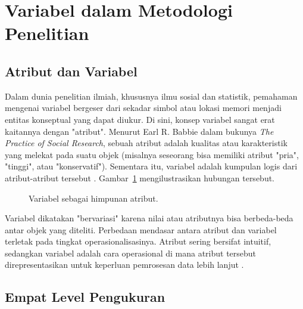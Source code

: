 \documentclass[11pt,a4paper]{article}
\begin{document}
\section{Variabel dalam Metodologi Penelitian}

\subsection{Atribut dan Variabel}

Dalam dunia penelitian ilmiah, khususnya ilmu sosial dan statistik, pemahaman mengenai variabel bergeser dari sekadar simbol atau lokasi memori menjadi entitas konseptual yang dapat diukur. Di sini, konsep variabel sangat erat kaitannya dengan "atribut". Menurut Earl R. Babbie dalam bukunya \textit{The Practice of Social Research}, sebuah atribut adalah kualitas atau karakteristik yang melekat pada suatu objek (misalnya seseorang bisa memiliki atribut "pria", "tinggi", atau "konservatif"). Sementara itu, variabel adalah kumpulan logis dari atribut-atribut tersebut \cite{babbie,wikipedia_research}. Gambar~\ref{fig:attr-var} mengilustrasikan hubungan tersebut.

\begin{figure}[H]
	\centering
	\caption{Variabel sebagai himpunan atribut.}
	\label{fig:attr-var}
\end{figure}

Variabel dikatakan "bervariasi" karena nilai atau atributnya bisa berbeda-beda antar objek yang diteliti. Perbedaan mendasar antara atribut dan variabel terletak pada tingkat operasionalisasinya. Atribut sering bersifat intuitif, sedangkan variabel adalah cara operasional di mana atribut tersebut direpresentasikan untuk keperluan pemrosesan data lebih lanjut \cite{wikipedia_research}.

\subsection{Empat Level Pengukuran}
\end{document}
